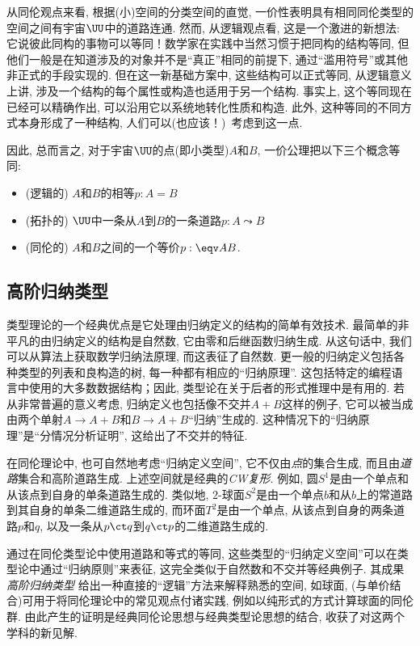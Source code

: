 从同伦观点来看, 根据(小)空间的分类空间的直觉, 一价性表明具有相同同伦类型的空间之间有宇宙$\UU$中的道路连通. 
然而, 从逻辑观点看, 这是一个激进的新想法: 它说彼此同构的事物可以等同！数学家在实践中当然习惯于把同构的结构等同, 但他们一般是在知道涉及的对象并不是``真正''相同的前提下, 通过``滥用符号''或其他非正式的手段实现的. 但在这一新基础方案中, 这些结构可以正式等同, 从逻辑意义上讲, 涉及一个结构的每个属性或构造也适用于另一个结构. 事实上, 这个等同现在已经可以精确作出, 可以沿用它以系统地转化性质和构造. 此外, 这种等同的不同方式本身形成了一种结构, 人们可以(也应该！)\ 考虑到这一点. 

因此, 总而言之, 对于宇宙$\UU$的点(即小类型)$A$和$B$, 一价公理把以下三个概念等同: 
\begin{itemize}
\item (逻辑的) $A$和$B$的相等$p:A=B$
\item (拓扑的) $\UU$中一条从$A$到$B$的一条道路$p:A \leadsto B$
\item (同伦的) $A$和$B$之间的一个等价$p:\eqv A B$.
\end{itemize}

\subsection*{高阶归纳类型}%

类型理论的一个经典优点是它处理由归纳定义的结构的简单有效技术. 
最简单的非平凡的由归纳定义的结构是自然数, 它由零和后继函数归纳生成. 
从这句话中, 我们可以从算法上获取数学归纳法原理, 而这表征了自然数. 
更一般的归纳定义包括各种类型的列表和良构造的树, 每一种都有相应的``归纳原理''. 
这包括特定的编程语言中使用的大多数数据结构；因此, 类型论在关于后者的形式推理中是有用的. 
若从非常普遍的意义考虑, 归纳定义也包括像不交并$A+B$这样的例子, 它可以被当成由两个单射$A\to A+B$和$B\to A+B$``归纳''生成的. 
这种情况下的``归纳原理''是``分情况分析证明'', 这给出了不交并的特征. 

在同伦理论中, 也可自然地考虑``归纳定义空间'', 它不仅由\emph{点}的集合生成, 而且由\emph{道路}集合和高阶道路生成. 
上述空间就是经典的\emph{CW复形}. 
%
例如, 圆$S^1$是由一个单点和从该点到自身的单条道路生成的. 
类似地, $2$-球面$S^2$是由一个单点$b$和从$b$上的常道路到其自身的单条二维道路生成的, 而环面$T^2$是由一个单点, 从该点到自身的两条道路$p$和$q$, 以及一条从$p\ct q$到$q\ct p$的二维道路生成的. 

通过在同伦类型论中使用道路和等式的等同, 这些类型的``归纳定义空间''可以在类型论中通过``归纳原则''来表征, 这完全类似于自然数和不交并等经典例子. 
其成果\emph{高阶归纳类型}
%
给出一种直接的``逻辑''方法来解释熟悉的空间, 如球面, (与单价结合)可用于将同伦理论中的常见观点付诸实践, 例如以纯形式的方式计算球面的同伦群. 
由此产生的证明是经典同伦论思想与经典类型论思想的结合, 收获了对这两个学科的新见解. 

